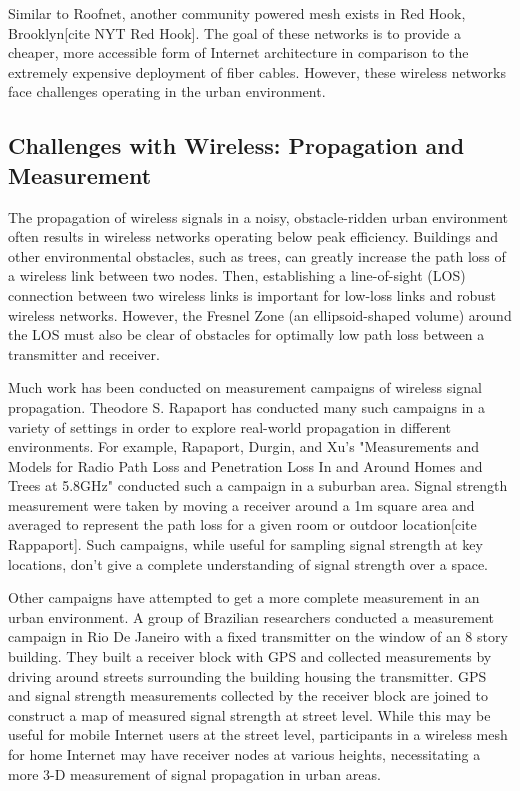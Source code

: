 \documentclass[pageno]{jpaper}
\begin{document}
Similar to Roofnet, another community powered mesh exists in Red Hook, Brooklyn[cite NYT Red Hook]. The goal of these networks is to provide a cheaper, more accessible form of Internet architecture in comparison to the extremely expensive deployment of fiber cables. However, these wireless networks face challenges operating in the urban environment.

\subsection{Challenges with Wireless: Propagation and Measurement}
The propagation of wireless signals in a noisy, obstacle-ridden urban environment often results in wireless networks operating below peak efficiency. Buildings and other environmental obstacles, such as trees, can greatly increase the path loss of a wireless link between two nodes. Then, establishing a line-of-sight (LOS) connection between two wireless links is important for low-loss links and robust wireless networks. However, the Fresnel Zone (an ellipsoid-shaped volume) around the LOS must also be clear of obstacles for optimally low path loss between a transmitter and receiver. 

Much work has been conducted on measurement campaigns of wireless signal propagation. Theodore S. Rapaport has conducted many such campaigns in a variety of settings in order to explore real-world propagation in different environments. For example, Rapaport, Durgin, and Xu's "Measurements and Models for Radio Path Loss and Penetration Loss In and Around Homes and Trees at 5.8GHz" conducted such a campaign in a suburban area. Signal strength measurement were taken by moving a receiver around a 1m square area and averaged to represent the path loss for a given room or outdoor location[cite Rappaport]. Such campaigns, while useful for sampling signal strength at key locations, don't give a complete understanding of signal strength over a space. 

Other campaigns have attempted to get a more complete measurement in an urban environment. A group of Brazilian researchers conducted a measurement campaign in Rio De Janeiro with a fixed transmitter on the window of an 8 story building. They built a receiver block with GPS and collected measurements by driving around streets surrounding the building housing the transmitter. GPS and signal strength measurements collected by the receiver block are joined to construct a map of measured signal strength at street level. While this may be useful for mobile Internet users at the street level, participants in a wireless mesh for home Internet may have receiver nodes at various heights, necessitating a more 3-D measurement of signal propagation in urban areas. 
\end{document}
